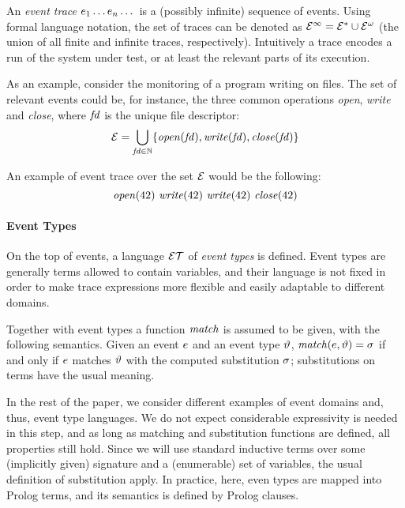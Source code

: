 An \emph{event trace} \(e_1\dots e_n\dots\) is a (possibly infinite) sequence of events.
Using formal language notation, the set of traces can be denoted as \(\mathcal{E}^\infty = \mathcal{E}^* \cup \mathcal{E}^\omega\) (the union of all finite and infinite traces, respectively).
Intuitively a trace encodes a run of the system under test, or at least the relevant parts of its execution.

As an example, consider the monitoring of a program writing on files.
The set of relevant events could be, for instance, the three common operations \emph{open}, \emph{write} and \emph{close}, where \(\mathit{fd}\) is the unique file descriptor:
\begin{equation}\label{eq:filedomain}
\mathcal{E} = \bigcup_{\mathit{fd} \in \mathbb{N}} \{\mathit{open}(\mathit{fd}), \mathit{write}(\mathit{fd}), \mathit{close}(\mathit{fd})\}
\end{equation}

An example of event trace over the set \(\mathcal{E}\) would be the following:
\begin{equation} \label{eq:trace}
	\mathit{open}(42)\ \mathit{write}(42)\ \mathit{write}(42)\ \mathit{close}(42)
\end{equation}

\paragraph{Event Types}
On the top of events, a language \(\mathcal{ET}\) of \emph{event types} is defined.
Event types are generally terms allowed to contain variables, and their language is not fixed in order to make trace expressions more flexible and easily adaptable to different domains.

Together with event types a function \(\mathit{match}\) is assumed to be given, with the following semantics.
Given an event \(e\) and an event type \(\vartheta\), \(\mathit{match}(e, \vartheta) = \sigma\) if and only if \(e\) matches \(\vartheta\) with the computed substitution \(\sigma\); substitutions on terms have the usual meaning.

In the rest of the paper, we consider different examples of event domains and, thus, event type languages.
We do not expect considerable expressivity is needed in this step, and as long as matching and substitution functions are defined, all properties still hold.
Since we will use standard inductive terms over some (implicitly given) signature and a (enumerable) set of variables, the usual definition of substitution apply. In practice, here, even types are mapped into Prolog terms, and its semantics is defined by Prolog clauses. 

